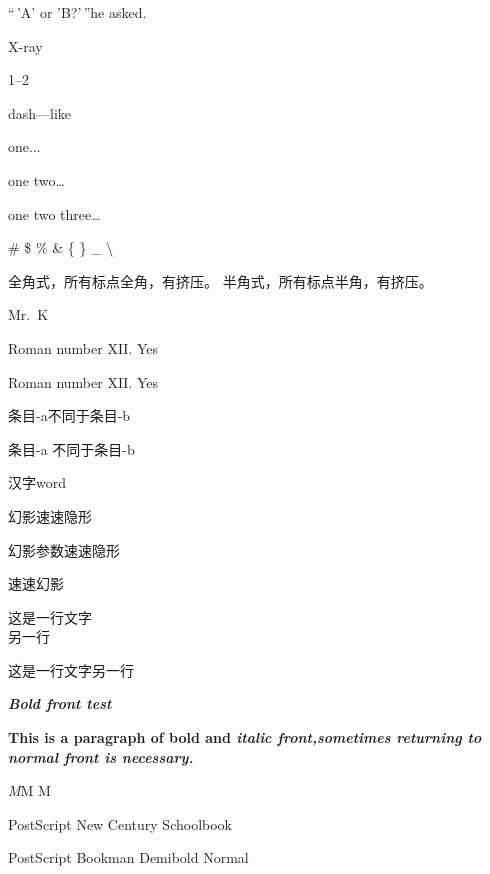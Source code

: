 \documentclass[UTF8]{ctexart}
\begin{document}
“\,'A' or 'B?'\,”he asked.

X-ray

1--2

dash---like

one...

one two\ldots

one two three\dots

\# \quad \$ \quad \% \quad \& \quad
\{ \quad \}	\quad \_ \quad
\textbackslash	%

全角式，所有标点全角，有挤压。%
半角式，所有标点半角，有挤压。

Mr.~K	%

Roman number XII. Yes

Roman number XII\@. Yes

条目-a不同于条目-b

\mbox{条目}-a 不同于条目-b %

\CJKsetecglue{}	%
汉字word

幻影\phantom{参数}速速隐形	%

\hphantom{123}幻影参数速速隐形\vphantom{123}

速速\vphantom{12}幻影

这是一行文字\\另一行

这是一行文字\linebreak 另一行	%


{\bfseries \slshape Bold front test}	%
\par 	%
\sffamily	%
\textbf{This is a paragraph of bold and
\textit{italic front,sometimes returning to \textnormal{normal front} is necessary. }}

{\itshape M}M M	%

\fontsize{18}{17}\selectfont
PostScript New Century Schoolbook

PostScript Bookman Demibold Normal
\end{document}
